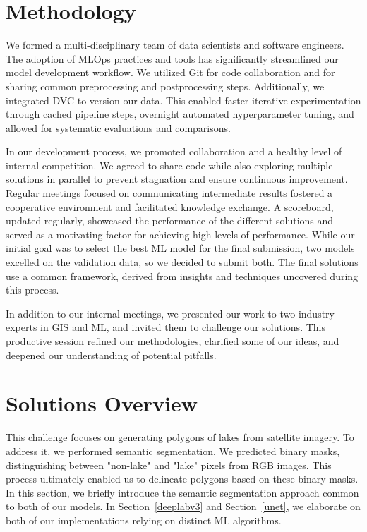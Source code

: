 \documentclass[sigconf]{acmart}
\begin{document}
\section{Methodology}

We formed a multi-disciplinary team of data scientists and software engineers. 
The adoption of MLOps practices and tools has significantly streamlined our model development workflow. 
We utilized Git for code collaboration and for sharing common preprocessing and postprocessing steps.
Additionally, we integrated DVC to version our data. 
This enabled faster iterative experimentation through cached pipeline steps, overnight automated hyperparameter tuning, and allowed for systematic evaluations and comparisons.

In our development process, we promoted collaboration and a healthy level of internal competition. 
We agreed to share code while also exploring multiple solutions in parallel to prevent stagnation and ensure continuous improvement. 
Regular meetings focused on communicating intermediate results fostered a cooperative environment and facilitated knowledge exchange. 
A scoreboard, updated regularly, showcased the performance of the different solutions and served as a motivating factor for achieving high levels of performance. 
While our initial goal was to select the best ML model for the final submission, two models excelled on the validation data, so we decided to submit both. 
The final solutions use a common framework, derived from insights and techniques uncovered during this process.

In addition to our internal meetings, we presented our work to two industry experts in GIS and ML, and invited them to challenge our solutions.
This productive session refined our methodologies, clarified some of our ideas, and deepened our understanding of potential pitfalls.

\section{Solutions Overview}

This challenge focuses on generating polygons of lakes from satellite imagery. 
To address it, we performed semantic segmentation.
We predicted binary masks, distinguishing between "non-lake" and "lake" pixels from RGB images. 
This process ultimately enabled us to delineate polygons based on these binary masks.
In this section, we briefly introduce the semantic segmentation approach common to both of our models. 
In Section~\ref{deeplabv3} and Section~\ref{unet}, we elaborate on both of our implementations relying on distinct ML algorithms.
\end{document}
